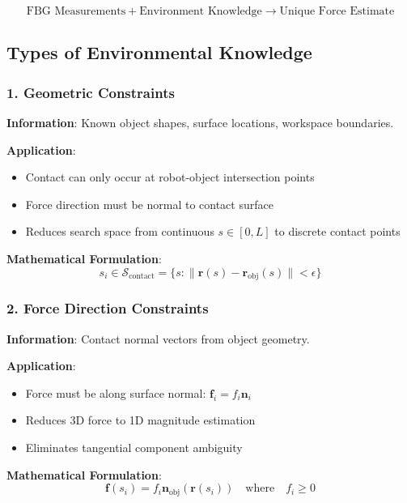 \documentclass[11pt]{article}
\begin{document}
\begin{equation}
\boxed{\text{FBG Measurements} + \text{Environment Knowledge} \rightarrow \text{Unique Force Estimate}}
\end{equation}

\subsection{Types of Environmental Knowledge}

\subsubsection{1. Geometric Constraints}

\textbf{Information}: Known object shapes, surface locations, workspace boundaries.

\textbf{Application}:
\begin{itemize}
    \item Contact can only occur at robot-object intersection points
    \item Force direction must be normal to contact surface
    \item Reduces search space from continuous $s \in [0, L]$ to discrete contact points
\end{itemize}

\textbf{Mathematical Formulation}:
\begin{equation}
s_i \in \mathcal{S}_{\text{contact}} = \{s : \|\mathbf{r}(s) - \mathbf{r}_{\text{obj}}(s)\| < \epsilon\}
\end{equation}

\subsubsection{2. Force Direction Constraints}

\textbf{Information}: Contact normal vectors from object geometry.

\textbf{Application}:
\begin{itemize}
    \item Force must be along surface normal: $\mathbf{f}_i = f_i \mathbf{n}_i$
    \item Reduces 3D force to 1D magnitude estimation
    \item Eliminates tangential component ambiguity
\end{itemize}

\textbf{Mathematical Formulation}:
\begin{equation}
\mathbf{f}(s_i) = f_i \mathbf{n}_{\text{obj}}(\mathbf{r}(s_i)) \quad \text{where} \quad f_i \geq 0
\end{equation}
\end{document}
